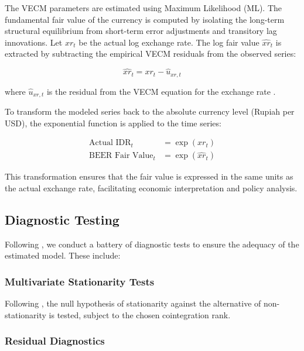 \documentclass[11pt,a4paper]{article}
\begin{document}
The VECM parameters are estimated using Maximum Likelihood (ML). The fundamental fair value of the currency is computed by isolating the long-term structural equilibrium from short-term error adjustments and transitory lag innovations. Let $xr_t$ be the actual log exchange rate. The log fair value $\widehat{xr}_t$ is extracted by subtracting the empirical VECM residuals from the observed series:

\begin{equation}
\widehat{xr}_t = xr_t - \hat{u}_{xr, t}
\label{eq:fair_value_log}
\end{equation}

where $\hat{u}_{xr, t}$ is the residual from the VECM equation for the exchange rate \citep{ClarkMacDonald1998}.

To transform the modeled series back to the absolute currency level (Rupiah per USD), the exponential function is applied to the time series:

\begin{align}
\text{Actual IDR}_t &= \exp(xr_t) \label{eq:actual_level} \\
\text{BEER Fair Value}_t &= \exp(\widehat{xr}_t) \label{eq:fair_value_level}
\end{align}

This transformation ensures that the fair value is expressed in the same units as the actual exchange rate, facilitating economic interpretation and policy analysis.

\subsection{Diagnostic Testing}

Following \cite{ClarkMacDonald1998}, we conduct a battery of diagnostic tests to ensure the adequacy of the estimated model. These include:

\subsubsection{Multivariate Stationarity Tests}

Following \cite{Johansen1995}, the null hypothesis of stationarity against the alternative of non-stationarity is tested, subject to the chosen cointegration rank.

\subsubsection{Residual Diagnostics}
\end{document}
